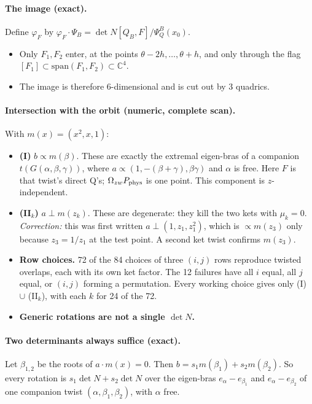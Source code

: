 \documentclass[11pt]{article}
\newcommand{\Om}{\Omega}
\begin{document}
\paragraph{The image (exact).} Define $\varphi_F$ by $\varphi_F\cdot\Psi_B=\det N[Q_B,F]/\Psi^B_Q(x_0)$.
\begin{itemize}
\item Only $F_1,F_2$ enter, at the points $\theta-2h,\dots,\theta+h$, and only through the flag $[F_1]\subset\mathrm{span}(F_1,F_2)\subset\mathbb C^4$.
\item The image is therefore 6-dimensional and is cut out by 3 quadrics.
\end{itemize}

\paragraph{Intersection with the orbit (numeric, complete scan).} With $m(x)=(x^2,x,1)$:
\begin{itemize}
\item \textbf{(I)} $b\propto m(\beta)$. These are exactly the extremal eigen-bras of a companion $t(G(\alpha,\beta,\gamma))$, where $a\propto(1,-(\beta+\gamma),\beta\gamma)$ and $\alpha$ is free. Here $F$ is that twist's direct Q's; $\Om_{zw}P_{\rm phys}$ is one point. This component is $z$-independent.
\item \textbf{(II$_k$)} $a\perp m(z_k)$. These are degenerate: they kill the two kets with $\mu_k=0$. \emph{Correction:} this was first written $a\perp(1,z_1,z_1^2)$, which is $\propto m(z_3)$ only because $z_3=1/z_1$ at the test point. A second ket twist confirms $m(z_3)$.
\item \textbf{Row choices.} 72 of the 84 choices of three $(i,j)$ rows reproduce twisted overlaps, each with its own ket factor. The 12 failures have all $i$ equal, all $j$ equal, or $(i,j)$ forming a permutation. Every working choice gives only (I) $\cup$ (II$_k$), with each $k$ for 24 of the 72.
\item \textbf{Generic rotations are not a single $\det N$.}
\end{itemize}

\paragraph{Two determinants always suffice (exact).} Let $\beta_{1,2}$ be the roots of $a\cdot m(x)=0$. Then $b=s_1m(\beta_1)+s_2m(\beta_2)$. So every rotation is $s_1\det N+s_2\det N$ over the eigen-bras $e_\alpha-e_{\beta_1}$ and $e_\alpha-e_{\beta_2}$ of one companion twist $(\alpha,\beta_1,\beta_2)$, with $\alpha$ free.
\end{document}
